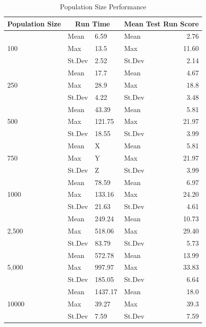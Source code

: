 \documentclass{article}
\begin{document}
\begin{table}[h]
\begin{center}
\begin{tabular}{|l|l|l|l|r|}
\hline%
\textbf{Population Size} & \multicolumn{2}{c|}{\textbf{Run Time}} & \multicolumn{2}{c|}{\textbf{Mean Test Run Score}} \\
\hline
\multirow{3}{*}{100}
& Mean & 6.59 & Mean & 2.76 \\
& Max & 13.5 & Max & 11.60 \\
& St.Dev & 2.52 & St.Dev & 2.14 \\
\hline
\multirow{3}{*}{250}
& Mean & 17.7 & Mean & 4.67 \\
& Max & 28.9 & Max & 18.8 \\
& St.Dev & 4.22 & St.Dev & 3.48 \\
\hline
\multirow{3}{*}{500}
& Mean & 43.39 & Mean & 5.81 \\
& Max & 121.75 & Max & 21.97 \\
& St.Dev & 18.55 & St.Dev & 3.99 \\
\hline
\multirow{3}{*}{750}
& Mean & X & Mean & 5.81 \\
& Max & Y & Max & 21.97 \\
& St.Dev & Z & St.Dev & 3.99 \\
\hline
\multirow{3}{*}{1000}
& Mean & 78.59 & Mean & 6.97 \\
& Max & 133.16 & Max & 24.20 \\
& St.Dev & 21.63 & St.Dev & 4.61 \\
\hline
\multirow{3}{*}{2,500}
& Mean & 249.24 & Mean & 10.73 \\
& Max & 518.06 & Max & 29.40 \\
& St.Dev & 83.79 & St.Dev & 5.73 \\
\hline
\multirow{3}{*}{5,000}
& Mean & 572.78 & Mean & 13.99 \\
& Max & 997.97 & Max & 33.83 \\
& St.Dev & 185.05 & St.Dev & 6.64 \\
\hline
\multirow{3}{*}{10000}
& Mean & 1437.17 & Mean & 18.0 \\
& Max & 39.27 & Max & 39.3 \\
& St.Dev & 7.59 & St.Dev & 7.59 \\
\hline
\end{tabular}
\end{center}
\caption{Population Size Performance}
\label{table:population_size}
\end{table}
\end{document}
